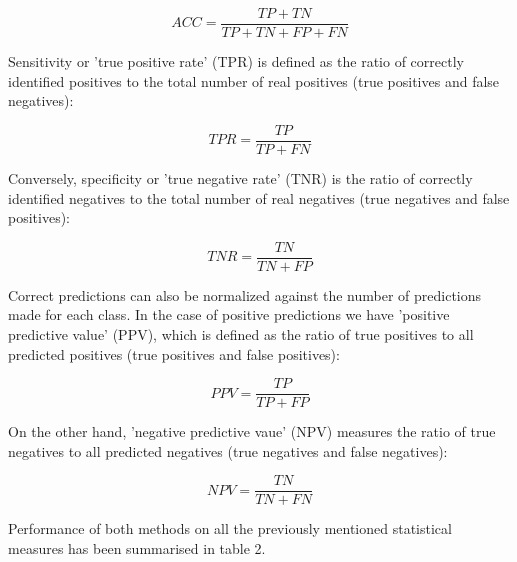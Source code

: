 \documentclass[11pt]{article} %
\begin{document}
	\[ ACC = \frac{TP + TN}{TP + TN + FP + FN}	\]
	
	Sensitivity or 'true positive rate' (TPR) is defined as the ratio of correctly identified positives to the total number of real positives (true positives and false negatives):
	
	\[ TPR = \frac{TP}{TP + FN} \]
	
	Conversely, specificity or 'true negative rate' (TNR) is the ratio of correctly identified negatives to the total number of real negatives (true negatives and false positives):
	
	\[ TNR = \frac{TN}{TN + FP} \]
	
	Correct predictions can also be normalized against the number of predictions made for each class. In the case of positive predictions we have 'positive predictive value' (PPV), which is defined as the ratio of true positives to all predicted positives (true positives and false positives):
	
	\[ 	PPV = \frac{TP}{TP + FP} \]
	
	 On the other hand, 'negative predictive vaue' (NPV) measures the ratio of true negatives to all predicted negatives (true negatives and false negatives):
	 
	 \[ 	NPV = \frac{TN}{TN + FN} \]
	
	Performance of both methods on all the previously mentioned statistical measures has been summarised in table 2.


	



\begin{table}[]

\caption{Comparison of results: feature extraction and image classification}
\end{table}
\end{document}
